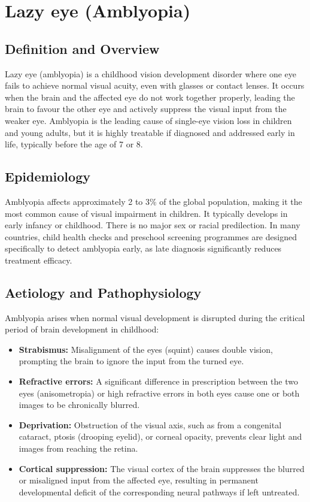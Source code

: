\chapter{Lazy eye (Amblyopia)}

\section*{Definition and Overview}
Lazy eye (amblyopia) is a childhood vision development disorder where one eye fails to achieve normal visual acuity, even with glasses or contact lenses. It occurs when the brain and the affected eye do not work together properly, leading the brain to favour the other eye and actively suppress the visual input from the weaker eye. Amblyopia is the leading cause of single-eye vision loss in children and young adults, but it is highly treatable if diagnosed and addressed early in life, typically before the age of 7 or 8.

\section*{Epidemiology}
Amblyopia affects approximately 2 to 3\% of the global population, making it the most common cause of visual impairment in children. It typically develops in early infancy or childhood. There is no major sex or racial predilection. In many countries, child health checks and preschool screening programmes are designed specifically to detect amblyopia early, as late diagnosis significantly reduces treatment efficacy.

\section*{Aetiology and Pathophysiology}
Amblyopia arises when normal visual development is disrupted during the critical period of brain development in childhood:

\begin{itemize}
    \item \textbf{Strabismus:} Misalignment of the eyes (squint) causes double vision, prompting the brain to ignore the input from the turned eye.
    \item \textbf{Refractive errors:} A significant difference in prescription between the two eyes (anisometropia) or high refractive errors in both eyes cause one or both images to be chronically blurred.
    \item \textbf{Deprivation:} Obstruction of the visual axis, such as from a congenital cataract, ptosis (drooping eyelid), or corneal opacity, prevents clear light and images from reaching the retina.
    \item \textbf{Cortical suppression:} The visual cortex of the brain suppresses the blurred or misaligned input from the affected eye, resulting in permanent developmental deficit of the corresponding neural pathways if left untreated.
\end{itemize}

